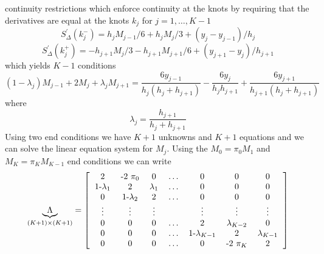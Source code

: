 \documentclass[12pt]{article}
\begin{document}
continuity restrictions which enforce continuity at the knots by requiring that the derivatives are equal at the knots $k_j$ for $j=1, \ldots , K-1$
\begin{equation}
S^{'}_{\Delta}(k^{-}_j)= h_j M_{j-1} / 6 +  h_j M_j / 3  + (y_j - y_{j-1})/h_j
\end{equation}
\begin{equation}
S^{'}_{\Delta}(k^{+}_j)=- h_{j+1} M_{j} / 3 - h_{j+1} M_{j+1} / 6  + (y_{j+1} - y_{j})/h_{j+1}
\end{equation}
which yields $K-1$ conditions
\begin{equation}
(1-\lambda_j ) M_{j-1} + 2 M_{j} + \lambda_j M_{j+1}= \frac{6 y_{j-1}}{h_j (h_j+h_{j+1})} - \frac{6 y_{j}}{h_j h_{j+1}} +\frac{6 y_{j+1}}{h_{j+1} (h_j+h_{j+1})}
\end{equation}
where 
\begin{equation}
\lambda_j = \frac{h_{j+1}}{h_j+h_{j+1}}
\end{equation}
Using two end conditions we have $K+1$ unknowns and $K+1$ equations and we can solve the linear equation system for $M_{j}$. Using the $M_0=\pi_0 M_1$ and $M_K=\pi_K M_{K-1}$ end conditions we can write 
\begin{equation}
\underbrace{\Lambda}_{(K+1) \times (K+1)}=\left[
\begin{tabular}{ccccccc}
2 & -2 $\pi_0$ & 0 & $\ldots$ & 0&0&0 \\
1-$\lambda_1$ & 2 &$ \lambda_1 $ & $\ldots$ & 0&0&0 \\
0 & 1-$\lambda_2$ & 2 & $\ldots$ & 0&0&0 \\
$\vdots$  &   $\vdots$  & $\vdots$  & & $\vdots$  &$\vdots$  &$\vdots$   \\
 0&0&0& $\ldots$ & 2&$\lambda_{K-2}$ &0 \\
 0&0&0& $\ldots$ & 1-$\lambda_{K-1}$&2&$\lambda_{K-1}$ \\
 0&0&0& $\ldots$ & 0&-2 $\pi_K$&2 \\
\end{tabular} \right]
\end{equation}
\end{document}
